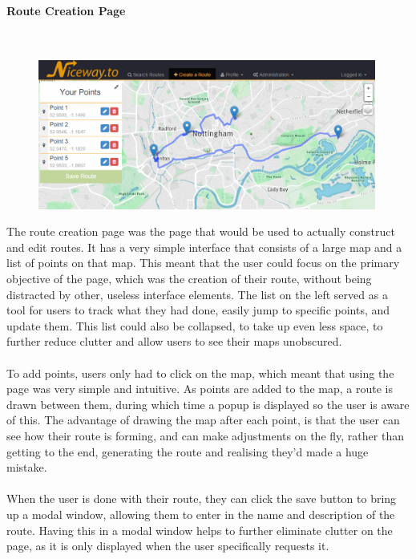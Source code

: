 \paragraph{Route Creation Page}\ \\
\begin{figure}[!ht]
	\vspace{-5mm}
	\begin{center}
		\includegraphics[width=0.99\textwidth]{images/design/create.png}
	\end{center}
	\vspace{-5mm}
\end{figure}

\noindent 
The route creation page was the page that would be used to actually construct and edit routes. It has a very simple interface that consists of a large map and a list of points on that map. This meant that the user could focus on the primary objective of the page, which was the creation of their route, without being distracted by other, useless interface elements. The list on the left served as a tool for users to track what they had done, easily jump to specific points, and update them. This list could also be collapsed, to take up even less space, to further reduce clutter and allow users to see their maps unobscured.\ \\
\ \\
To add points, users only had to click on the map, which meant that using the page was very simple and intuitive. As points are added to the map, a route is drawn between them, during which time a popup is displayed so the user is aware of this. The advantage of drawing the map after each point, is that the user can see how their route is forming, and can make adjustments on the fly, rather than getting to the end, generating the route and realising they'd made a huge mistake. \ \\
\ \\
When the user is done with their route, they can click the save button to bring up a modal window, allowing them to enter in the name and description of the route. Having this in a modal window helps to further eliminate clutter on the page, as it is only displayed when the user specifically requests it.

